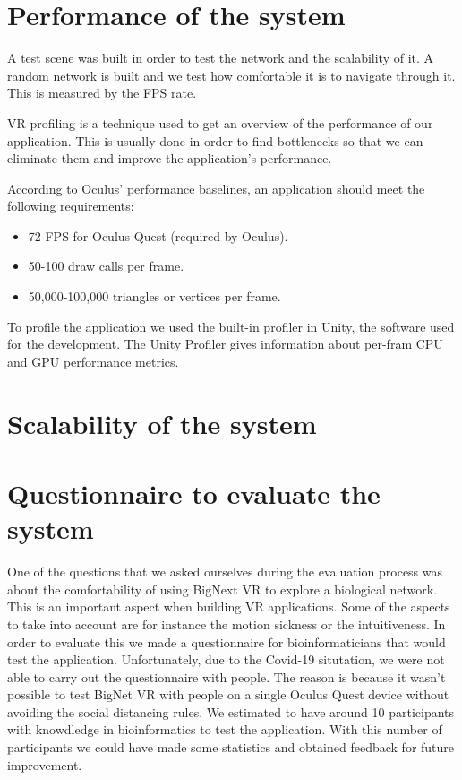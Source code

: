 \section{Performance of the system}
A test scene was built in order to test the network and the scalability of it. A random network is built and we test how comfortable it is to navigate through it. This is measured by the FPS rate.

VR profiling is a technique used to get an overview of the performance of our application. This is usually done in order to find bottlenecks so that we can eliminate them and improve the application's performance.

According to Oculus' performance baselines\cite{oculus_performance_baselines}, an application should meet the following requirements:
\begin{itemize}
  \item 72 FPS for Oculus Quest (required by Oculus).
  \item 50-100 draw calls per frame.
  \item 50,000-100,000 triangles or vertices per frame.
\end{itemize}

To profile the application we used the built-in profiler in Unity, the software used for the development. The Unity Profiler gives information about per-fram CPU and GPU performance metrics.

\section{Scalability of the system}

\section{Questionnaire to evaluate the system}
One of the questions that we asked ourselves during the evaluation process was about the comfortability of using BigNext VR to explore a biological network. This is an important aspect when building VR applications. Some of the aspects to take into account are for instance the motion sickness or the intuitiveness. In order to evaluate this we made a questionnaire for bioinformaticians that would test the application. Unfortunately, due to the Covid-19 situtation\cite{covid_19}, we were not able to carry out the questionnaire with people. The reason is because it wasn't possible to test BigNet VR with people on a single Oculus Quest device without avoiding the social distancing rules.
We estimated to have around 10 participants with knowdledge in bioinformatics to test the application. With this number of participants we could have made some statistics and obtained feedback for future improvement.


